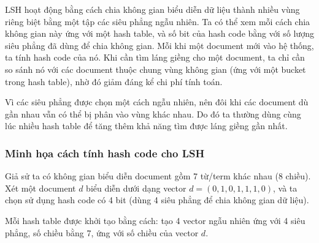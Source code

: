 	LSH hoạt động bằng cách chia không gian biểu diễn dữ liệu thành nhiều vùng riêng biệt bằng một tập các siêu phẳng ngẫu nhiên. Ta có thể xem mỗi cách chia không gian này ứng với một hash table, và số bit của hash code bằng với số lượng siêu phẳng đã dùng để chia không gian. Mỗi khi một document mới vào hệ thống, ta tính hash code của nó. Khi cần tìm láng giềng cho một document, ta chỉ cần so sánh nó với các document thuộc chung vùng không gian (ứng với một bucket trong hash table), nhờ đó giảm đáng kể chi phí tính toán.
	
	
	Vì các siêu phẳng được chọn một cách ngẫu nhiên, nên đôi khi các document dù gần nhau vẫn có thể bị phân vào vùng khác nhau. Do đó ta thường dùng cùng lúc nhiều hash table để tăng thêm khả năng tìm được láng giềng gần nhất.	

	\subsubsection{Minh họa cách tính hash code cho LSH}
		
	Giả sử ta có không gian biểu diễn document gồm 7 từ/term khác nhau (8 chiều). Xét một document $d$ biểu diễn dưới dạng vector $d = (0,1,0,1,1,1,0)$, và ta chọn sử dụng hash code có 4 bit (dùng 4 siêu phẳng để chia không gian dữ liệu).
	
	Mỗi hash table được khởi tạo bằng cách: tạo 4 vector ngẫu nhiên ứng với 4 siêu phẳng, số chiều bằng 7, ứng với số chiều của vector $d$.
	
